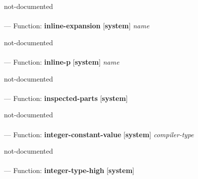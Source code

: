 \begin{adjustwidth}{5em}{5em}
not-documented
\end{adjustwidth}

\paragraph{}
\label{SYSTEM:INLINE-EXPANSION}
--- Function: \textbf{inline-expansion} [\textbf{system}] \textit{name}

\begin{adjustwidth}{5em}{5em}
not-documented
\end{adjustwidth}

\paragraph{}
\label{SYSTEM:INLINE-P}
--- Function: \textbf{inline-p} [\textbf{system}] \textit{name}

\begin{adjustwidth}{5em}{5em}
not-documented
\end{adjustwidth}

\paragraph{}
\label{SYSTEM:INSPECTED-PARTS}
--- Function: \textbf{inspected-parts} [\textbf{system}] \textit{}

\begin{adjustwidth}{5em}{5em}
not-documented
\end{adjustwidth}

\paragraph{}
\label{SYSTEM:INTEGER-CONSTANT-VALUE}
--- Function: \textbf{integer-constant-value} [\textbf{system}] \textit{compiler-type}

\begin{adjustwidth}{5em}{5em}
not-documented
\end{adjustwidth}

\paragraph{}
\label{SYSTEM:INTEGER-TYPE-HIGH}
--- Function: \textbf{integer-type-high} [\textbf{system}] \textit{}

